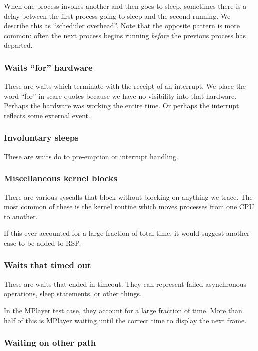 \documentclass[10pt]{article}
\begin{document}
When one process invokes another and then goes to sleep, sometimes there is a delay between the first process going to sleep and the second running.  We describe this as ``scheduler overhead''.  Note that the opposite pattern is more common: often the next process begins running \emph{before} the previous process has departed.

\subsubsection{Waits ``for'' hardware}

These are waits which terminate with the receipt of an interrupt.  We place the word ``for'' in scare quotes because we have no visibility into that hardware.  Perhaps the hardware was working the entire time.  Or perhaps the interrupt reflects some external event.

\subsubsection{Involuntary sleeps}

These are waits do to pre-emption or interrupt handling.

\subsubsection{Miscellaneous kernel blocks}

There are various syscalls that block without blocking on anything we trace.  The most common of these is the kernel routine which moves processes from one CPU to another.

If this ever accounted for a large fraction of total time, it would suggest another case to be added to RSP.

\subsubsection{Waits that timed out}

These are waits that ended in timeout.  They can represent failed asynchronous operations, sleep statements, or other things.

In the MPlayer test case, they account for a large fraction of time.  More than half of this is MPlayer waiting until the correct time to display the next frame.

\subsubsection{Waiting on other path}
\end{document}
